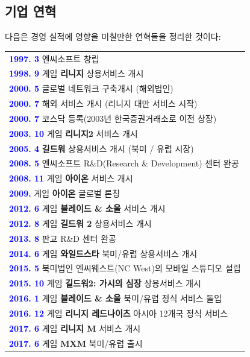 \documentclass[11pt]{oblivoir}
\newenvironment{textbox}
	{
	\begin{center}
		\begin{tabular}{|p{0.95\textwidth}|}
			\hline
	}
	{
		\\ \hline
		\end{tabular}
		\end{center}
	}
\begin{document}
		\subsection{기업 연혁}
			\noindent
			다음은 경영 실적에 영향을 미칠만한 연혁들을 정리한 것이다:
			\begin{textbox}
			\textbf{\textcolor{blue}{1997. 3}} 엔씨소프트 창립
			\\
			\textbf{\textcolor{blue}{1998. 9}} 게임  \textbf{리니지} 상용서비스 개시
			\\
			\textbf{\textcolor{blue}{2000. 5}} 글로벌 네트워크 구축개시 (해외법인)
			\\
			\textbf{\textcolor{blue}{2000. 7}} 해외 서비스 개시 (리니지 대만 서비스 시작)
			\\
			\textbf{\textcolor{blue}{2000. 7}} 코스닥 등록(2003년 한국증권거래소로 이전 상장)
			\\
			\textbf{\textcolor{blue}{2003. 10}} 게임 \textbf{리니지2} 서비스 개시
			\\
			\textbf{\textcolor{blue}{2005. 4}} \textbf{길드워} 상용서비스 개시 (북미 / 유럽 시장)
			\\
			\textbf{\textcolor{blue}{2008. 5}} 엔씨소프트 R\&D(Research \& Development) 센터 완공
			\\
			\textbf{\textcolor{blue}{2008. 11}} 게임 \textbf{아이온} 서비스 개시
			\\
			\textbf{\textcolor{blue}{2009.}} 게임 \textbf{아이온} 글로벌 론칭
			\\
			\textbf{\textcolor{blue}{2012. 6}} 게임 \textbf{블레이드 \& 소울} 서비스 개시
			\\
			\textbf{\textcolor{blue}{2012. 8}} 게임 \textbf{길드워 2} 상용서비스 개시
			\\
			\textbf{\textcolor{blue}{2013. 8}} 판교 R\&D 센터 완공
			\\
			\textbf{\textcolor{blue}{2014. 6}} 게임 \textbf{와일드스타} 북미/유럽 상용서비스 개시
			\\
			\textbf{\textcolor{blue}{2015. 5}} 북미법인 엔씨웨스트(NC West)의 모바일 스튜디오 설립
			\\
			\textbf{\textcolor{blue}{2015. 10}} 게임 \textbf{길드워2: 가시의 심장} 상용서비스 개시
			\\
			\textbf{\textcolor{blue}{2016. 1}} 게임 \textbf{블레이드 \& 소울} 북미/유럽 정식 서비스 돌입
			\\
			\textbf{\textcolor{blue}{2016. 12}} 게임 \textbf{리니지 레드나이츠} 아시아 12개국 정식 서비스
			\\
			\textbf{\textcolor{blue}{2017. 6}} 게임 \textbf{리니지 M} 서비스 개시
			\\
			\textbf{\textcolor{blue}{2017. 6}} 게임 \textbf{MXM} 북미/유럽 출시
		\end{textbox}
\end{document}
